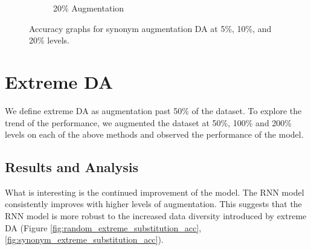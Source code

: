\documentclass{article}
\begin{document}
\begin{figure}[ht]
\begin{subfigure}[b]{0.3\textwidth}
    \caption{20\% Augmentation}
    \label{fig:synonym_20}
  \end{subfigure}
  \caption{Accuracy graphs for synonym augmentation DA at 5\%, 10\%, and 20\% levels.}
  \label{fig:synonym_substitution_acc}
\end{figure}

\section{Extreme DA}

We define extreme DA as augmentation past 50\% of the dataset. To explore the
trend of the performance, we augmented the dataset at 50\%, 100\% and 200\%
levels on each of the above methods and observed the performance of the model.

\subsection{Results and Analysis}

What is interesting is the continued improvement of the model. The RNN model
consistently improves with higher levels of augmentation. This suggests that
the RNN model is more robust to the increased data diversity introduced by
extreme DA (Figure \ref{fig:random_extreme_substitution_acc},
\ref{fig:synonym_extreme_substitution_acc}).
\end{document}
